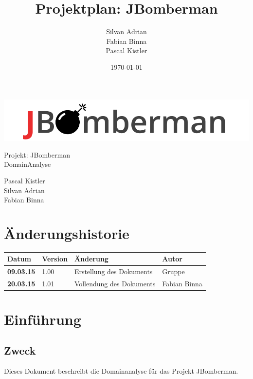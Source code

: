\documentclass[11pt]{scrartcl}
\title{Projektplan: JBomberman}
\author{Silvan Adrian \\ Fabian Binna \\ Pascal Kistler}
\date{\today{}}
\begin{document}
\def\arraystretch{1.5}
\begin{titlepage}
\begin{center}
\vspace{10em}
\includegraphics[scale=2]{jbomberman}
\vspace{10em}
\end{center}
\begin{center}
\huge {Projekt: JBomberman} \\
\huge {DomainAnalyse}
\end{center}
\begin{center}
\vspace{10em}
\LARGE {Pascal Kistler} \\
\LARGE {Silvan Adrian} \\
\LARGE {Fabian Binna}
\end{center}

\end{titlepage}

\newpage
\section{Änderungshistorie}
\label{sec:Änderungen}

\begin{tabularx}{\linewidth}{l l l l}
\textbf{Datum} & \textbf{Version} & \textbf{Änderung}  & \textbf{Autor} \\
\hline
\textbf{09.03.15} & 1.00 & Erstellung des Dokuments & Gruppe \\
\textbf{20.03.15} & 1.01 & Vollendung des Dokuments & Fabian Binna \\
\end{tabularx}

\newpage
\tableofcontents
\newpage
\section{Einführung}
\label{sec:Einführung}

\subsection{Zweck}
\label{sec:Zweck}
Dieses Dokument beschreibt die Domainanalyse für das Projekt JBomberman.
\end{document}

